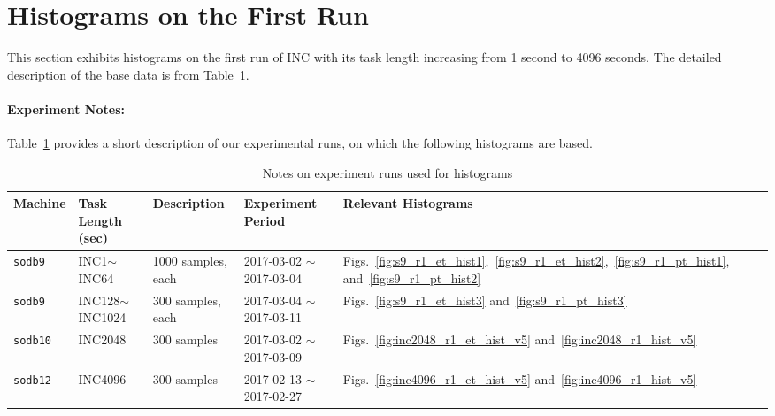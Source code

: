 \section{Histograms on the First Run~\label{sec:first_run}} 
This section exhibits histograms on the first run of 
INC with its task length increasing from 1 second to 4096 seconds. 
The detailed description of the base data is from Table~\ref{tab:exp_notes1}.

\paragraph{Experiment Notes:}
Table~\ref{tab:exp_notes1} provides a short description of our experimental runs, 
on which the following histograms are based.

\begin{table}[h]
\begin{center}
\begin{tabular}{|p{2cm}|p{3cm}|p{3cm}|p{4cm}|p{3cm}|} \hline
Machine & Task Length (sec) & Description & Experiment Period & Relevant \linebreak Histograms\\ \hline
{\tt sodb9} &  INC1$\sim$INC64 & 1000 samples, each & 2017-03-02 $\sim$ 2017-03-04 & Figs.~\ref{fig:s9_r1_et_hist1},~\ref{fig:s9_r1_et_hist2},~\ref{fig:s9_r1_pt_hist1}, and~\ref{fig:s9_r1_pt_hist2}\\ \hline
{\tt sodb9} &  INC128$\sim$INC1024 & 300 samples, each & 2017-03-04 $\sim$ 2017-03-11 & 
Figs.~\ref{fig:s9_r1_et_hist3} and~\ref{fig:s9_r1_pt_hist3}\\ \hline
{\tt sodb10} & INC2048 & 300 samples & 2017-03-02 $\sim$ 2017-03-09 & Figs.~\ref{fig:inc2048_r1_et_hist_v5} and~\ref{fig:inc2048_r1_hist_v5}\\ \hline
{\tt sodb12} & INC4096 & 300 samples & 2017-02-13 $\sim$ 2017-02-27 & Figs.~\ref{fig:inc4096_r1_et_hist_v5} and~\ref{fig:inc4096_r1_hist_v5}\\ \hline
\end{tabular}
\end{center}
\vspace{-.2in}
\caption{Notes on experiment runs used for histograms\label{tab:exp_notes1}}
\end{table}

\pagebreak

